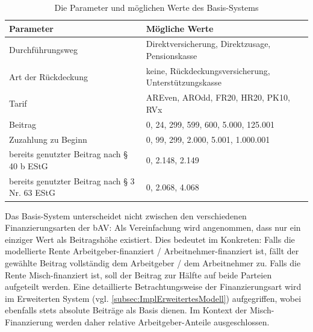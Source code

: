 \begin{table}[htb!]
\footnotesize
\begin{tabularx}{\textwidth}{|X|l|}
\hline
\cellcolor{grauinfo}Parameter                                      & \cellcolor{grauinfo}Mögliche Werte                                       \\ \hline
Durchführungsweg                               & Direktversicherung, Direktzusage, Pensionskasse      \\ \hline
Art der Rückdeckung\footnotemark               & keine, Rückdeckungsversicherung, Unterstützungskasse \\ \hline
Tarif                                          & AREven, AROdd, FR20, HR20, PK10, RVx                 \\ \hline
Beitrag                                        & 0, 24, 299, 599, 600, 5.000, 125.001                 \\ \hline
Zuzahlung zu Beginn                            & 0, 99, 299, 2.000, 5.001, 1.000.001                  \\ \hline
bereits genutzter Beitrag nach § 40 b EStG     & 0, 2.148, 2.149                                      \\ \hline
bereits genutzter Beitrag nach § 3 Nr. 63 EStG & 0, 2.068, 4.068                                      \\ \hline
\end{tabularx}
\normalsize
\caption{Die Parameter und möglichen Werte des Basis-Systems}
\label{tab:sutSimple}
\end{table}

Das Basis-System unterscheidet nicht zwischen den verschiedenen Finanzierungsarten der bAV: Als Vereinfachung wird angenommen, dass nur ein einziger Wert als Beitragshöhe existiert. Dies bedeutet im Konkreten: Falls die modellierte Rente Arbeitgeber-finanziert / Arbeitnehmer-finanziert ist, fällt der gewählte Beitrag vollständig dem Arbeitgeber / dem Arbeitnehmer zu. Falls die Rente Misch-finanziert ist, soll der Beitrag zur Hälfte auf beide Parteien aufgeteilt werden. Eine detaillierte Betrachtungsweise der Finanzierungsart wird im Erweiterten System (vgl. \autoref{subsec:ImplErweitertesModell}) aufgegriffen, wobei ebenfalls stets absolute Beiträge als Basis dienen. Im Kontext der Misch-Finanzierung werden daher relative Arbeitgeber-Anteile ausgeschlossen.

